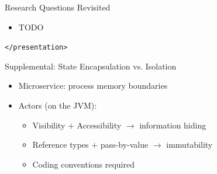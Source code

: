 \documentclass{beamer}
\begin{document}

\begin{frame}{Research Questions Revisited}

\begin{itemize}
  \item TODO
\end{itemize}

\end{frame}


\begin{frame}{}

\vspace{1cm}
\begin{center}
  \texttt{</presentation>}
\end{center}

\end{frame}


\begin{frame}{Supplemental: State Encapsulation vs. Isolation}

\begin{itemize}
  \item Microservice: process memory boundaries
  \item Actors (on the JVM):
  \begin{itemize}
    \item Visibility $+$ Accessibility $\rightarrow$ information hiding
    \item Reference types $+$ pass-by-value $\rightarrow$ immutability
    \item Coding conventions required
  \end{itemize}
\end{itemize}

\end{frame}

\end{document}
